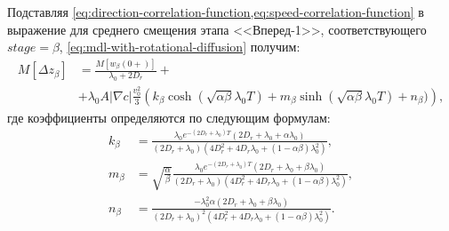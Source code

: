 Подставляя \cref{eq:direction-correlation-function,eq:speed-correlation-function} в выражение для среднего смещения этапа <<Вперед-1>>, соответствующего $stage=\beta$, \cref{eq:mdl-with-rotational-diffusion} получим:
\begin{equation}
    \begin{aligned}
        M[\Delta z_{\beta}]&=\frac{M[w_{\beta}(0+)]}{\lambda_0+2 D_r} + \\ &+ \lambda_0 A |\nabla c| \frac{v_0^2}{3} \left ( k_{\beta} \cosh(\sqrt{\alpha \beta} \lambda_0 T) + m_{\beta} \sinh(\sqrt{\alpha \beta} \lambda_0 T) + n_{\beta}) \right ),
        \label{eq:mdlrd-solution-beta}
    \end{aligned}
\end{equation}
где коэффициенты определяются по следующим формулам:
\begin{equation}
    \begin{aligned}
        k_{\beta}&=\frac{\lambda_0 e^{-(2D_r+\lambda_0)T}(2D_r+\lambda_0+\alpha\lambda_0)}{(2D_r+\lambda_0)(4D_r^2+4D_r\lambda_0+(1-\alpha\beta)\lambda_0^2)}, \\
        m_{\beta}&=\sqrt{\frac{\alpha}{\beta}}\frac{\lambda_0 e^{-(2D_r+\lambda_0)T}(2D_r+\lambda_0+\beta\lambda_0)}{(2D_r+\lambda_0)(4D_r^2+4D_r\lambda_0+(1-\alpha\beta)\lambda_0^2)}, \\
        n_{\beta}&=\frac{-\lambda_0^2 \alpha (2D_r+\lambda_0+\beta\lambda_0)}{(2D_r+\lambda_0)^2(4D_r^2+4D_r\lambda_0+(1-\alpha\beta)\lambda_0^2)}. \\
        \label{eq:mdlrd-solution-beta-coeffs}
    \end{aligned}
\end{equation}

